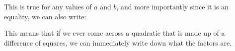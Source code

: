       \label{m39394*id275245}This is true for any values of $a$ and $b$, and more importantly since it is an equality, we can also write:\par 
      \label{m39394*id275270}\nopagebreak\noindent{}
      \label{m39394*id275324}This means that if we ever come across a quadratic that is made up of a difference of squares, we can immediately write down what the factors are.\par 
\label{m39394*secfhsst!!!underscore!!!id2008}\vspace{.5cm} 
      \noindent
